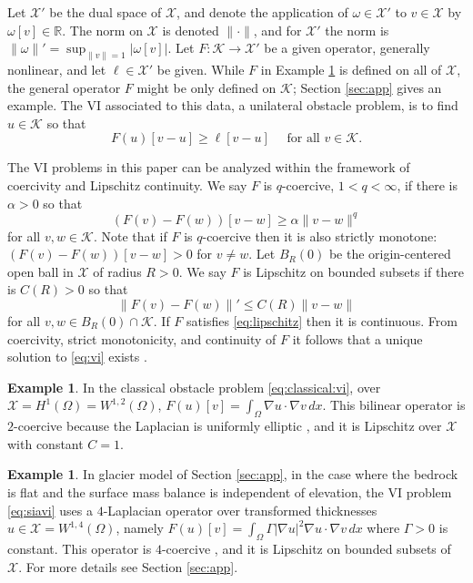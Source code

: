 \documentclass[]{interact}
\theoremstyle{plain}%
\theoremstyle{definition}
\newtheorem{example}[theorem]{Example}
\theoremstyle{remark}
\newcommand{\RR}{\mathbb{R}}
\newcommand{\grad}{\nabla}
\newcommand{\cK}{\mathcal{K}}
\newcommand{\cX}{\mathcal{X}}
\begin{document}
Let $\cX'$ be the dual space of $\cX$, and denote the application of $\omega \in \cX'$ to $v\in \cX$ by $\omega[v] \in \RR$.  The norm on $\cX$ is denoted $\|\cdot\|$, and for $\cX'$ the norm is $\|\omega\|' = \sup_{\|v\|=1} |\omega[v]|$.  Let $F:\cK \to \cX'$ be a given operator, generally nonlinear, and let $\ell\in \cX'$ be given.  While $F$ in Example \ref{example:classicalobstacle} is defined on all of $\cX$, the general operator $F$ might be only defined on $\cK$; Section \ref{sec:app} gives an example.  The VI associated to this data, a unilateral obstacle problem, is to find $u\in \cK$ so that
\begin{equation} \label{eq:vi}
F(u)[v - u] \ge \ell[v - u] \quad \text{ for all } v \in \cK.
\end{equation}

The VI problems in this paper can be analyzed within the framework of coercivity and Lipschitz continuity.  We say $F$ is $q$-coercive, $1<q<\infty$, if there is $\alpha>0$ so that
\begin{equation} \label{eq:coercive}
(F(v) - F(w))[v - w] \ge \alpha \|v-w\|^q
\end{equation}
for all $v,w \in \cK$.  Note that if $F$ is $q$-coercive then it is also strictly monotone: $(F(v) - F(w))[v - w] > 0$ for $v\ne w$.  Let $B_R(0)$ be the origin-centered open ball in $\cX$ of radius $R>0$.  We say $F$ is Lipschitz on bounded subsets if there is $C(R)>0$ so that
\begin{equation} \label{eq:lipschitz}
\|F(v)-F(w)\|' \le C(R) \|v-w\|
\end{equation}
for all $v,w \in B_R(0)\cap \cK$.  If $F$ satisfies \eqref{eq:lipschitz} then it is continuous.  From coercivity, strict monotonicity, and continuity of $F$ it follows that a unique solution to \eqref{eq:vi} exists \cite[Corollary III.1.8]{KinderlehrerStampacchia1980}.

\begin{example}  \label{example:classicalobstacle}
In the classical obstacle problem \eqref{eq:classical:vi}, over $\cX=H^1(\Omega)=W^{1,2}(\Omega)$, $F(u)[v] = \int_\Omega \grad u\cdot \grad v\,dx$.  This bilinear operator is $2$-coercive because the Laplacian is uniformly elliptic \cite{Evans2010}, and it is Lipschitz over $\cX$ with constant $C=1$.
\end{example}

\begin{example}  \label{example:flatsia}
In glacier model of Section \ref{sec:app}, in the case where the bedrock is flat and the surface mass balance is independent of elevation, the VI problem \eqref{eq:siavi} uses a $4$-Laplacian operator over transformed thicknesses $u\in\cX=W^{1,4}(\Omega)$, namely $F(u)[v] = \int_\Omega \Gamma |\grad u|^2\grad u\cdot \grad v\,dx$ where $\Gamma>0$ is constant.  This operator is $4$-coercive \cite[for example]{JouvetBueler2012}, and it is Lipschitz on bounded subsets of $\cX$.  For more details see Section \ref{sec:app}.
\end{example}
\end{document}
